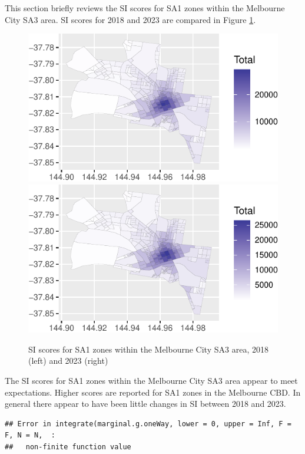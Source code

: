 \documentclass[]{tufte-book}
\begin{document}
This section briefly reviews the SI scores for SA1 zones within the
Melbourne City SA3 area. SI scores for 2018 and 2023 are compared in
Figure \ref{fig:Melbourne_City_SI}.

\begin{figure}
\includegraphics[width=0.5\linewidth]{Reynolds_Currie_2024_transit_supply_index_GTFS_files/figure-latex/Melbourne_City_SI-1} \includegraphics[width=0.5\linewidth]{Reynolds_Currie_2024_transit_supply_index_GTFS_files/figure-latex/Melbourne_City_SI-2} \caption[SI scores for SA1 zones within the Melbourne City SA3 area, 2018 (left) and 2023 (right)]{SI scores for SA1 zones within the Melbourne City SA3 area, 2018 (left) and 2023 (right)}\label{fig:Melbourne_City_SI}
\end{figure}

The SI scores for SA1 zones within the Melbourne City SA3 area appear to
meet expectations. Higher scores are reported for SA1 zones in the
Melbourne CBD. In general there appear to have been little changes in SI
between 2018 and 2023.

\begin{verbatim}
## Error in integrate(marginal.g.oneWay, lower = 0, upper = Inf, F = F, N = N,  : 
##   non-finite function value
\end{verbatim}
\end{document}
